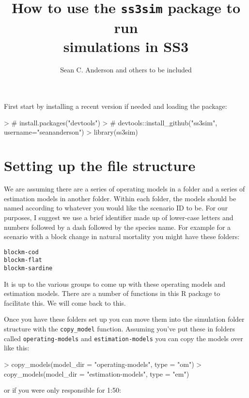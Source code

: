\documentclass[12pt]{article}
\title{How to use the \texttt{ss3sim} package to run\\simulations in SS3}
\author{Sean C. Anderson and others to be included}
\date{}
\begin{document}
\maketitle

\noindent
First start by installing a recent version if needed and loading the package:

\begin{Schunk}
\begin{Sinput}
> # install.packages("devtools")
> # devtools::install_github("ss3sim", username="seananderson")
> library(ss3sim)
\end{Sinput}
\end{Schunk}

\section*{Setting up the file structure}
We are assuming there are a series of operating models in a folder and a series
of estimation models in another folder. Within each folder, the models should be
named according to whatever you would like the scenario ID to be. For our
purposes, I suggest we use a brief identifier made up of lower-case letters and
numbers followed by a dash followed by the species name. For example for a
scenario with a block change in natural mortality you might have these folders:

\begin{verbatim}
blockm-cod
blockm-flat
blockm-sardine
\end{verbatim}

\noindent
It is up to the various groups to come up with these operating models and
estimation models. There are a number of functions in this R package to
facilitate this. We will come back to this. 

Once you have these folders set up you can move them into the simulation folder
structure with the \texttt{copy\_model} function. Assuming you've put these in
folders called \texttt{operating-models} and \texttt{estimation-models} you can
copy the models over like this:

\begin{Schunk}
\begin{Sinput}
> copy_models(model_dir = "operating-models", type = "om")
> copy_models(model_dir = "estimation-models", type = "em")
\end{Sinput}
\end{Schunk}

\noindent
or if you were only responsible for 1:50:
\end{document}
